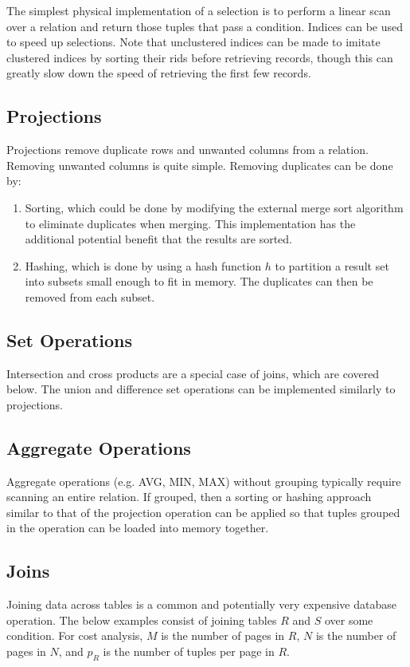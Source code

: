 \documentclass[12pt,titlepage]{article}
\begin{document}
      The simplest physical implementation of a selection is to perform a linear scan over a relation and return those tuples that pass a condition. Indices can
      be used to speed up selections. Note that unclustered indices can be made to imitate clustered indices by sorting their rids before retrieving records, though
      this can greatly slow down the speed of retrieving the first few records.

    \subsection{Projections}
      Projections remove duplicate rows and unwanted columns from a relation. Removing unwanted columns is quite simple. Removing duplicates can be done by:

      \begin{enumerate}
        \item Sorting, which could be done by modifying the external merge sort algorithm to eliminate duplicates when merging. This implementation has the
          additional potential benefit that the results are sorted.
        \item Hashing, which is done by using a hash function $h$ to partition a result set into subsets small enough to fit in memory. The duplicates can then
          be removed from each subset.
      \end{enumerate}

    \subsection{Set Operations}
      Intersection and cross products are a special case of joins, which are covered below. The union and difference set operations can be implemented similarly
      to projections.

    \subsection{Aggregate Operations}
      Aggregate operations (e.g. AVG, MIN, MAX) without grouping typically require scanning an entire relation. If grouped, then a sorting or hashing approach
      similar to that of the projection operation can be applied so that tuples grouped in the operation can be loaded into memory together.

    \subsection{Joins}
      Joining data across tables is a common and potentially very expensive database operation. The below examples consist of joining tables $R$ and $S$ over some
      condition. For cost analysis, $M$ is the number of pages in $R$, $N$ is the number of pages in $N$, and $p_R$ is the number of tuples per page in $R$.
\end{document}
